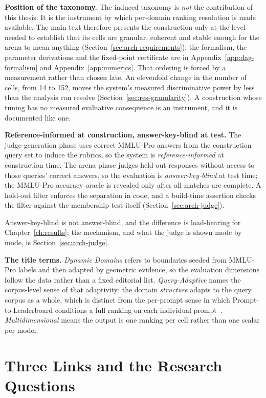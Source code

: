 \textbf{Position of the taxonomy.} The induced taxonomy is \emph{not}
the contribution of this thesis. It is the instrument by which
per-domain ranking resolution is made available. The main text
therefore presents the construction only at the level needed to
establish that its cells are granular, coherent and stable enough for
the arena to mean anything (Section~\ref{sec:arch-requirements}); the
formalism, the parameter derivations and the fixed-point certificate
are in Appendix~\ref{app:dag-formalism} and
Appendix~\ref{app:numerics}. That ordering is forced by a measurement
rather than chosen late. An elevenfold change in the number of cells,
from 14 to 152, moves the system's measured discriminative power by
less than the analysis can resolve
(Section~\ref{sec:res-granularity}). A construction whose tuning has no
measured evaluative consequence is an instrument, and it is documented
like one.

\textbf{Reference-informed at construction, answer-key-blind at test.}
The judge-generation phase uses correct MMLU-Pro answers from the
construction query set to induce the rubrics, so the system is
\emph{reference-informed} at construction time. The arena phase judges
held-out responses without access to those queries' correct answers, so
the evaluation is \emph{answer-key-blind} at test time; the MMLU-Pro
accuracy oracle is revealed only after all matches are complete. A
hold-out filter enforces the separation in code, and a build-time
assertion checks the filter against the membership test itself
(Section~\ref{sec:arch-judge}).

Answer-key-blind is not answer-blind, and the difference is
load-bearing for Chapter~\ref{ch:results}; the mechanism, and what
the judge is shown mode by mode, is Section~\ref{sec:arch-judge}.

\textbf{The title terms.} \emph{Dynamic Domains} refers to boundaries
seeded from MMLU-Pro labels and then adapted by geometric evidence, so
the evaluation dimensions follow the data rather than a fixed editorial
list. \emph{Query-Adaptive} names the corpus-level sense of that
adaptivity: the domain \emph{structure} adapts to the query corpus as a
whole, which is distinct from the per-prompt sense in which
Prompt-to-Leaderboard conditions a full ranking on each individual
prompt~\parencite{frick2025p2l}. \emph{Multidimensional} means the
output is one ranking per cell rather than one scalar per model.

\section{Three Links and the Research Questions}\label{sec:research-questions}

